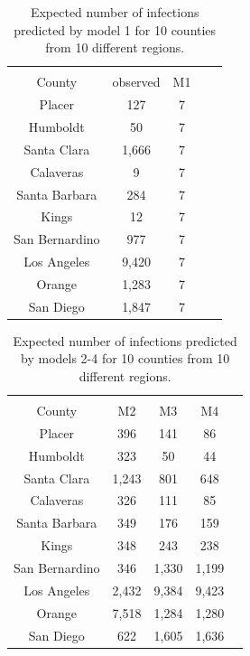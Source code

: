 \documentclass[11pt,twocolumn]{asaproc}
\begin{document}
\begin{table}
\caption{Expected number of infections predicted by model 1 for 10 counties from 10 different regions.}
\label{tab:infections}
\begin{center}
\begin{tabular}{ccccc}
\hline
\hline
\\[-5pt]
\multicolumn{1}{c}{County} &
\multicolumn{1}{c}{observed} &
\multicolumn{1}{c}{M1}\\
\hline
Placer&	127&   7\\
Humboldt&     50&  7 \\
Santa Clara&	1,666& 7\\
Calaveras&     9&  7\\
Santa Barbara&     284& 7\\
Kings&     12& 7\\
San Bernardino&     977& 7\\
Los Angeles&     9,420& 7\\
Orange&     1,283& 7\\
San Diego&     1,847& 7\\
\hline
\end{tabular}
\end{center}
\end{table}



\begin{table}
\caption{Expected number of infections predicted by models 2-4 for 10 counties from 10 different regions.}
\label{tab:infectionss}
\begin{center}
\begin{tabular}{ccccc}
\hline
\hline
\\[-5pt]
\multicolumn{1}{c}{County} &
\multicolumn{1}{c}{M2} &
\multicolumn{1}{c}{M3} &
\multicolumn{1}{c}{M4}\\
\hline
Placer&	396&   141 & 86\\
Humboldt&     323&  50 &	 44\\
Santa Clara&	1,243& 801	& 648\\
Calaveras&     326&  111 & 85\\
Santa Barbara&     349& 176 & 159\\
Kings&     348& 243 & 238\\
San Bernardino&     346& 1,330 & 1,199\\
Los Angeles&     2,432& 9,384 & 9,423\\
Orange&     7,518& 1,284 & 1,280\\
San Diego&     622& 1,605 & 1,636\\
\hline
\end{tabular}
\end{center}
\end{table}
\end{document}
